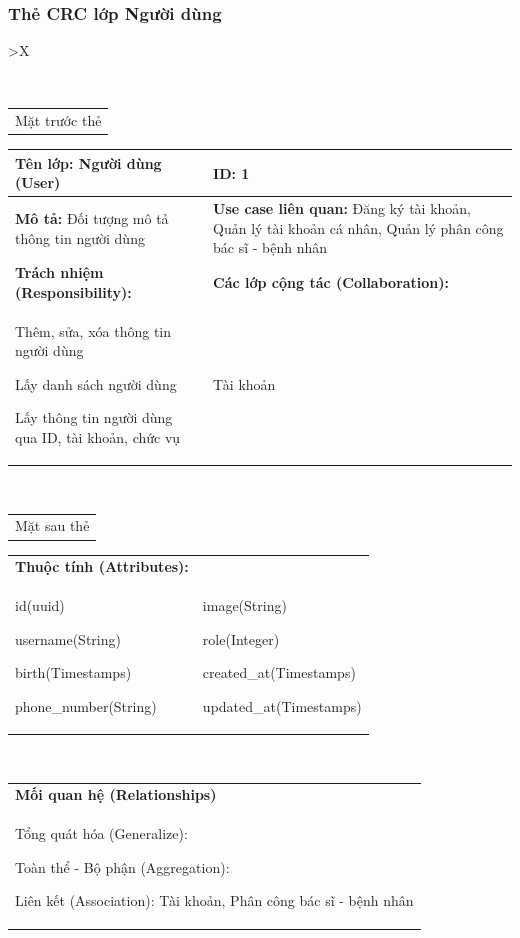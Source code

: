 \subsubsection{Thẻ CRC lớp Người dùng}
\begin{xltabular}{\textwidth}{
   >{\centering\arraybackslash}X 
  }
  \caption{\bfseries \fontsize{12pt}{0pt}\selectfont Thẻ CRC lớp Người dùng}
  \\
  \begin{tabularx}{0.9\textwidth}{X}
    Mặt trước thẻ
  \end{tabularx}
  \begin{tabularx}{0.9\textwidth}{|X|X|}
    \hline
    \textbf{Tên lớp:} Người dùng (User) & \textbf{ID:} 1 \\
    \hline
    \textbf{Mô tả:} Đối tượng mô tả thông tin người dùng & \textbf{Use case liên quan:}  Đăng ký tài khoản, Quản lý tài khoản cá nhân, Quản lý phân công bác sĩ - bệnh nhân\\
    \hline
    \textbf{Trách nhiệm (Responsibility):} & \textbf{Các lớp cộng tác (Collaboration):} \\
    Thêm, sửa, xóa thông tin người dùng 

    Lấy danh sách người dùng

    Lấy thông tin người dùng qua ID, tài khoản, chức vụ
    & 
    Tài khoản
    \\
    \hline
  \end{tabularx}
  \\ 
  \begin{tabularx}{0.9\textwidth}{X}
    Mặt sau thẻ
  \end{tabularx} 
  \begin{tabularx}{0.9\textwidth}{|X|X|}
    \hline
    \textbf{Thuộc tính (Attributes):} & \\
    id(uuid) 
    
    username(String)

    birth(Timestamps)

    phone\_number(String)
    & 
    image(String) 
    
    role(Integer) 
    
    created\_at(Timestamps)

    updated\_at(Timestamps)
    \\ \hline
  \end{tabularx}
  \\     
  \begin{tabularx}{0.9\textwidth}{|X|}
    \hline
   \textbf{Mối quan hệ (Relationships)} \\
    Tổng quát hóa (Generalize):  

    Toàn thể - Bộ phận (Aggregation):
    
    Liên kết (Association): Tài khoản, Phân công bác sĩ - bệnh nhân 
    \\
    \hline
  \end{tabularx}
  \end{xltabular}

